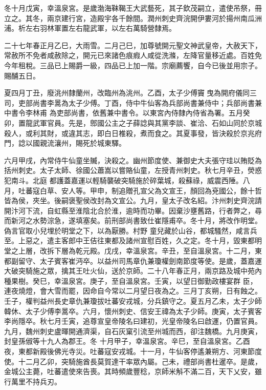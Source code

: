 \begin{pinyinscope}
 冬十月戊寅，幸溫泉宮。是歲渤海靺鞨王大武藝死，其子欽茂嗣立，遣使吊祭，冊立之。其冬，兩京建行宮，造殿宇各千餘間。潤州刺史齊浣開伊婁河於揚州南瓜洲浦。析左右羽林軍置左右龍武軍，以左右萬騎營隸焉。



 二十七年春正月乙巳，大雨雪。二月己巳，加尊號開元聖文神武皇帝，大赦天下，常赦所不免者咸赦除之，開元已來諸色痕瘕人咸從洗滌，左降官量移近處。百姓免今年租稅。三品已上賜爵一級，四品已上加一階。宗廟薦饗，自今已後並用宗子。賜酺五日。



 夏四月丁丑，廢洮州隸蘭州，改臨州為洮州。乙酉，太子少傅竇曳為開府儀同三司，吏部尚書李暠為太子少傅。丁酉，侍中牛仙客為兵部尚書兼侍中；兵部尚書兼中書令李林甫
 為吏部尚書，依舊兼中書令。以東宮內侍隸內侍省為署。五月癸卯，置龍武軍官員。先是，鄎國公主之子薛諗與其黨李談、崔洽、石如山同於京城殺人，或利其財，或違其志，即白日椎殺，煮而食之。其夏事發，皆決殺於京兆府門，諗以國親流瀼州，賜死於城東驛。



 六月甲戌，內常侍牛仙童坐贓，決殺之。幽州節度使、兼御史大夫張守珪以賄貶為括州刺史。太子太師、徐國公蕭嵩以嘗賂仙童，左授青州刺史。秋七月辛丑，熒惑犯南斗。北庭
 都護蓋嘉運以輕騎襲破突騎施於碎葉城，殺蘇祿，威震西陲。八月，吐蕃寇白草、安人等。甲申，制追贈孔宣父為文宣王，顏回為兗國公，餘十哲皆為侯，夾坐。後嗣褒聖侯改封為文宣公。九月，皇太子改名紹。汴州刺史齊浣請開汴河下流，自虹縣至淮陰北合於淮，逾時而功畢。因棄沙壅舊路，行者弊之，尋而新河之水勢淙急，遂填塞矣。前刑部尚書致仕崔隱甫卒。冬十月，將改作明堂。偽言官取小兒埋於明堂之下，以為厭勝。村野
 童兒藏於山谷，都城騷然，咸言兵至。上惡之，遣主客郎中王佶往東都及諸州宣慰百姓，久之定。冬十月，毀東都明堂之上層，改拆下層為乾元殿。戊戌，幸溫泉宮。辛丑，至自溫泉宮。十二月，東都副留守、太子賓客崔沔卒。以益州司馬章仇兼瓊權劍南節度等使。是歲，蓋嘉運大破突騎施之眾，擒其王吐火仙，送於京師。二十八年春正月，兩京路及城中苑內種果樹。癸巳，幸溫泉宮。庚子，至自溫泉宮。壬寅，以望日御勤政樓宴群
 臣，連夜燒燈，會大雪而罷，因命自今常以二月望日夜為之。三月丁亥朔，日有蝕之。壬子，權判益州長史章仇兼瓊拔吐蕃安戎城，分兵鎮守之。夏五月乙未，太子少師韓休、太子少傅李暠卒。六月，懷州刺史、信安王禕為太子少師。庚寅，太子賓客李尚隱卒。秋七月壬寅，追尊宣皇帝陵名曰建初，光皇帝陵名曰啟運，仍置官員。九月，魏州刺史盧暉開通濟渠，自石灰窠引流至州城而西，卻注魏橋。九月庚寅，封皇孫俶等十九人為郡王。冬
 十月甲子，幸溫泉宮。辛巳，至自溫泉宮。乙酉夜，東都新殿後佛光寺災。吐蕃寇安戎城。十一月，牛仙客停遙兼朔方、河東節度使。十二月乙卯，突騎施酋長莫賀達干率眾內屬。己未，禮部尚書杜暹卒。是歲，金城公主薨，吐蕃遣使來告喪。其時頻歲豐稔，京師米斛不滿二百，天下乂安，雖行萬里不持兵刃。




\end{pinyinscope}
